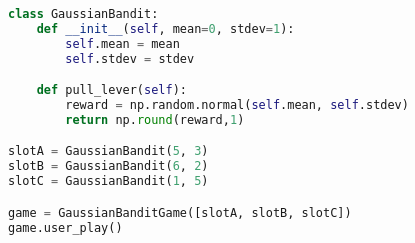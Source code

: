 \begin{lstlisting}[language=Python]
class GaussianBandit:
    def __init__(self, mean=0, stdev=1):
        self.mean = mean
        self.stdev = stdev

    def pull_lever(self):
        reward = np.random.normal(self.mean, self.stdev)
        return np.round(reward,1)

slotA = GaussianBandit(5, 3)
slotB = GaussianBandit(6, 2)
slotC = GaussianBandit(1, 5)

game = GaussianBanditGame([slotA, slotB, slotC])
game.user_play()
\end{lstlisting}





